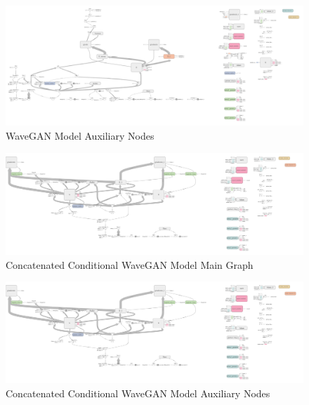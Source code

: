 \documentclass[a4paper, titlepage]{article}
\begin{document}
\begin{appendices}
  \clearpage

  \begin{figure}[ht]
    \caption{WaveGAN Model Auxiliary Nodes}
    \centering
    \includegraphics[width=1\textwidth, trim={120cm 0 0 0}, clip]{WGAN}
  \end{figure}
  \clearpage

  \begin{figure}[ht]
    \caption{Concatenated Conditional WaveGAN Model Main Graph}
    \centering
    \includegraphics[width=1.25\textwidth, angle=90, trim={0 0 50cm 0}, clip]{cWGAN}
  \end{figure}
  
  \clearpage

  \begin{figure}[ht]
    \caption{Concatenated Conditional WaveGAN Model Auxiliary Nodes}
    \centering
    \includegraphics[width=1\textwidth, trim={120cm 0 0 0}, clip]{cWGAN}
  \end{figure}
  \clearpage


\end{appendices}
\end{document}
